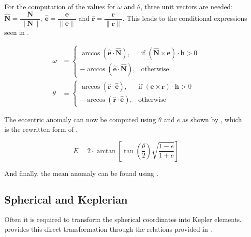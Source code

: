 \noindent
For the computation of the values for $\omega$ and $\theta$, three unit vectors are needed: $\hat{\mathbf{N}}=\dfrac{\mathbf{N}}{\|\mathbf{N}\|}$, $\hat{\mathbf{e}}=\dfrac{\mathbf{e}}{\|\mathbf{e}\|}$ and $\hat{\mathbf{r}}=\dfrac{\mathbf{r}}{\|\mathbf{r}\|}$. This leads to the conditional expressions seen in . 



\begin{equation}\label{eq:omegathetacond}
\begin{split}
\omega&=\begin{cases}
\arccos\left(\hat{\mathbf{e}}\cdot\hat{\mathbf{N}}\right), & \text{if } \left(\hat{\mathbf{N}} \times \mathbf{e}\right) \cdot \mathbf{h}>0\\
-\arccos\left(\hat{\mathbf{e}}\cdot\hat{\mathbf{N}}\right), & \text{otherwise}
\end{cases}\\
\theta&=\begin{cases}
\arccos\left(\hat{\mathbf{r}}\cdot\hat{\mathbf{e}}\right), & \text{if } \left(\mathbf{e} \times \mathbf{r}\right) \cdot \mathbf{h}>0\\
-\arccos\left(\hat{\mathbf{r}}\cdot\hat{\mathbf{e}}\right), & \text{otherwise}
\end{cases}
\end{split}
\end{equation}

\noindent
The eccentric anomaly can now be computed using $\theta$ and $e$ as shown by , which is the rewritten form of .

\begin{equation}\label{eq:ecc}
E=2\cdot\arctan\left[\tan\left(\dfrac{\theta}{2}\right)\sqrt{\dfrac{1-e}{1+e}}\right]
\end{equation}

\noindent
And finally, the mean anomaly can be found using \citep{noomen2013basic}.


\newpage
\subsection{Spherical and Keplerian}
\label{subsec:spherkepl}
Often it is required to transform the spherical coordinates into Kepler elements. \cite{wakker2010astro1} provides this direct transformation through the relations provided in . 


